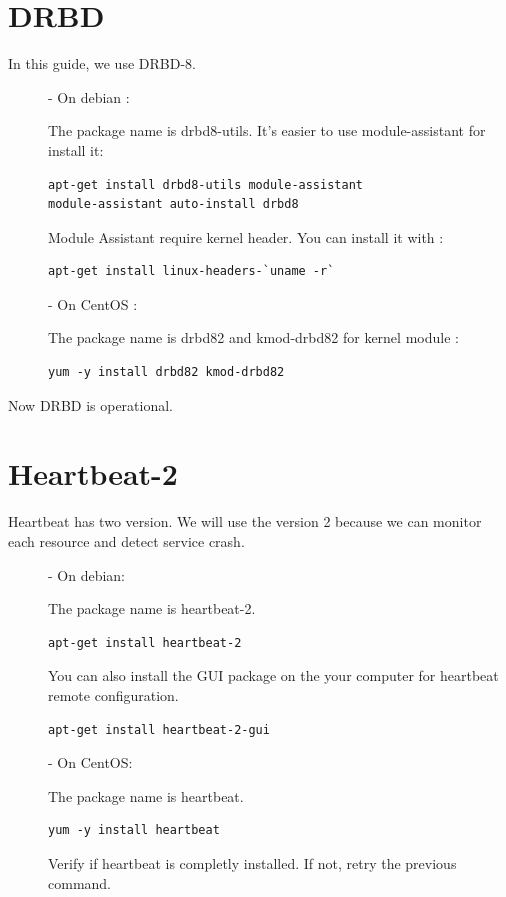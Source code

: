 \documentclass[a4paper,10pt]{report}
\begin{document}
\section{DRBD}
In this guide, we use DRBD-8.
\begin{description}
\item[]- On debian :

The package name is drbd8-utils. It's easier to use module-assistant for install it:
\begin{lstlisting}
apt-get install drbd8-utils module-assistant
module-assistant auto-install drbd8
\end{lstlisting} 



Module Assistant require kernel header. You can install it with :
\begin{lstlisting}
apt-get install linux-headers-`uname -r`
\end{lstlisting}

\item[]- On CentOS :

The package name is drbd82 and kmod-drbd82 for kernel module :
\begin{lstlisting}
yum -y install drbd82 kmod-drbd82
\end{lstlisting} 

\end{description}

Now DRBD is operational.


\section{Heartbeat-2}
Heartbeat has two version. We will use the version 2 because we can monitor each resource and detect service crash.
\begin{description}
\item[]- On debian:

The package name is heartbeat-2.
\begin{lstlisting}
apt-get install heartbeat-2
\end{lstlisting}
You can also install the GUI package on the your computer for heartbeat remote configuration.
\begin{lstlisting}
apt-get install heartbeat-2-gui
\end{lstlisting}

\item[]- On CentOS:

The package name is heartbeat.
\begin{lstlisting}
yum -y install heartbeat
\end{lstlisting}
Verify if heartbeat is completly installed. If not, retry the previous command.

\end{description}
\end{document}
